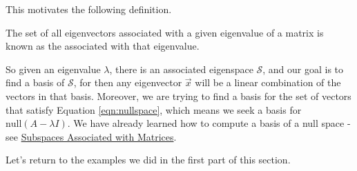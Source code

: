 \documentclass{ximera}
\begin{document}
This motivates the following definition.
    
\begin{definition}\label{def:eigspace}
The set of all eigenvectors associated with a given eigenvalue of a matrix is known as the  associated with that eigenvalue.
\end{definition}
    
So given an eigenvalue $\lambda$, there is an associated eigenspace $\mathcal{S}$, and our goal is to find a basis of $\mathcal{S}$, for then any eigenvector $\vec{x}$ will be a linear combination of the vectors in that basis.  Moreover, we are trying to find a basis for the set of vectors that satisfy Equation \ref{eqn:nullspace}, which means we seek a basis for $\mbox{null}(A-\lambda I)$.  We have already learned how to compute a basis of a null space - see \href{https://ximera.osu.edu/oerlinalg/LinearAlgebra/VSP-0040/main}{Subspaces Associated with Matrices}.
    
Let's return to the examples we did in the first part of this section.
    
\end{document}
